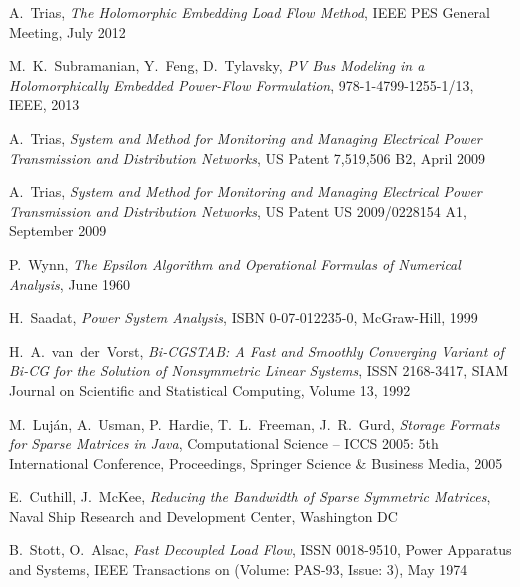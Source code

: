 \begin{thebibliography}{1}
	A.~Trias, \emph{The Holomorphic Embedding Load Flow Method}, IEEE PES General Meeting, July 2012
	
	M.~K.~Subramanian, Y.~Feng, D.~Tylavsky, \emph{PV Bus Modeling in a Holomorphically Embedded Power-Flow Formulation}, 978-1-4799-1255-1/13, IEEE, 2013
	
	A.~Trias, \emph{System and Method for Monitoring and Managing Electrical Power Transmission and Distribution Networks}, US Patent 7,519,506 B2, April 2009
	
	A.~Trias, \emph{System and Method for Monitoring and Managing Electrical Power Transmission and Distribution Networks}, US Patent US 2009/0228154 A1, September 2009
				
	P.~Wynn, \emph{The Epsilon Algorithm and Operational Formulas of Numerical Analysis}, June 1960
	
	H.~Saadat, \emph{Power System Analysis}, ISBN 0-07-012235-0, McGraw-Hill, 1999
	
	H.~A.~van~der~Vorst, \emph{Bi-CGSTAB: A Fast and Smoothly Converging Variant of Bi-CG for the Solution of Nonsymmetric Linear Systems}, ISSN 2168-3417, SIAM Journal on Scientific and Statistical Computing, Volume 13, 1992
	
	M.~Luján, A.~Usman, P.~Hardie, T.~L.~Freeman, J.~R.~Gurd, \emph{Storage Formats for Sparse Matrices in Java}, Computational Science -- ICCS 2005: 5th International Conference, Proceedings, Springer Science \& Business Media, 2005

	E.~Cuthill, J.~McKee, \emph{Reducing the Bandwidth of Sparse Symmetric Matrices}, Naval Ship Research and Development Center, Washington DC
	
	B.~Stott, O.~Alsac, \emph{Fast Decoupled Load Flow}, ISSN 0018-9510, Power Apparatus and Systems, IEEE Transactions on (Volume: PAS-93, Issue: 3), May 1974
\end{thebibliography}